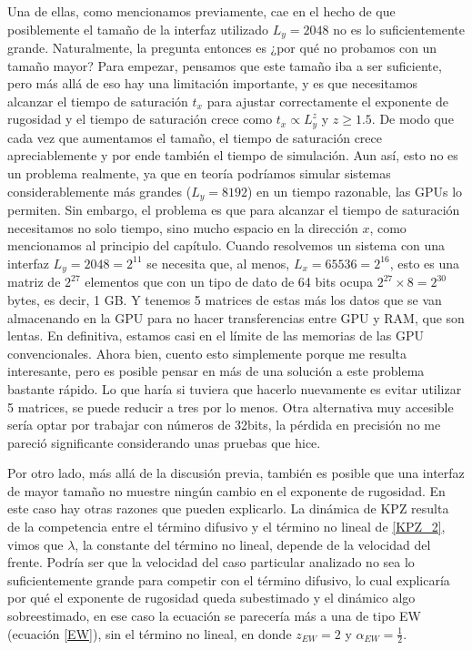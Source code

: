Una de ellas, como mencionamos previamente, cae en el hecho de que posiblemente el tamaño de la interfaz utilizado $L_y = 2048$ no es lo suficientemente grande. Naturalmente, la pregunta entonces es ¿por qué no probamos con un tamaño mayor? Para empezar, pensamos que este tamaño iba a ser suficiente, pero más allá de eso hay una limitación importante, y es que necesitamos alcanzar el tiempo de saturación $t_x$ para ajustar correctamente el exponente de rugosidad y el tiempo de saturación crece como $t_x\propto L_y^z$ y $z \geq 1.5$. De modo que cada vez que aumentamos el tamaño, el tiempo de saturación crece apreciablemente y por ende también el tiempo de simulación. Aun así, esto no es un problema realmente, ya que en teoría podríamos simular sistemas considerablemente más grandes ($L_y = 8192$) en un tiempo razonable, las GPUs lo permiten. Sin embargo, el problema es que para alcanzar el tiempo de saturación necesitamos no solo tiempo, sino mucho espacio en la dirección $x$, como mencionamos al principio del capítulo. Cuando resolvemos un sistema con una interfaz $L_y = 2048 = 2^{11}$ se necesita que, al menos, $L_x = 65536 = 2^{16}$, esto es una matriz de $2^{27}$ elementos que con un tipo de dato de 64 bits ocupa $2^{27}\times 8 = 2^{30}$ bytes, es decir, 1 GB. Y tenemos 5 matrices de estas más los datos que se van almacenando en la GPU para no hacer transferencias entre GPU y RAM, que son lentas. En definitiva, estamos casi en el límite de las memorias de las GPU convencionales. Ahora bien, cuento esto simplemente porque me resulta interesante, pero es posible pensar en más de una solución a este problema bastante rápido. Lo que haría si tuviera que hacerlo nuevamente es evitar utilizar 5 matrices, se puede reducir a tres por lo menos. Otra alternativa muy accesible sería optar por trabajar con números de 32bits, la pérdida en precisión no me pareció significante considerando unas pruebas que hice.

Por otro lado, más allá de la discusión previa, también es posible que una interfaz de mayor tamaño no muestre ningún cambio en el exponente de rugosidad. En este caso hay otras razones que pueden explicarlo. La dinámica de KPZ resulta de la competencia entre el término difusivo y el término no lineal de \ref{KPZ_2}, vimos que $\lambda$, la constante del término no lineal, depende de la velocidad del frente. Podría ser que la velocidad del caso particular analizado no sea lo suficientemente grande para competir con el término difusivo, lo cual explicaría por qué el exponente de rugosidad queda subestimado y el dinámico algo sobreestimado, en ese caso la ecuación se parecería más a una de tipo EW (ecuación \ref{EW}), sin el término no lineal, en donde $z_{EW} = 2$ y $\alpha_{EW} = \frac{1}{2}$.

